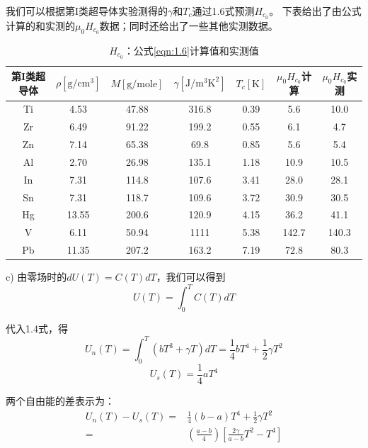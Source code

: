 我们可以根据第I类超导体实验测得的$\gamma$和$T_c$通过1.6式预测$H_{c_0}$。
下表给出了由公式计算的和实测的$\mu_0 H_{c_0}$数据；同时还给出了一些其他实测数据。
\begin{table}[htbp]\small
  \centering
  \caption{$H_{c_0}$：公式\ref{eqn:1.6}计算值和实测值} \label{tb:eqn1.6andexp}
\begin{tabular}{|c||c|c|c|c|c|c|}
  \hline
第I类超导体&$\rho [\mathrm{g/cm^3}]$&$M [\mathrm{g/mole}]$&$\gamma [\mathrm{J/m^3K^2}]$&$T_c [\mathrm{K}]$&$\mu_0 H_{c_0}$计算&$\mu_0 H_{c_0}$实测 \\ \hline \hline
Ti&4.53&47.88&316.8&0.39&5.6&10.0 \\ \hline
Zr&6.49&91.22&199.2&0.55&6.1&4.7\\ \hline
Zn&7.14&65.38&69.8&0.85&5.6&5.4\\ \hline
Al&2.70&26.98&135.1&1.18&10.9&10.5\\ \hline
In&7.31&114.8&107.6&3.41&28.0&28.1\\  \hline
Sn&7.31&118.7&109.6&3.72&30.9&30.5\\  \hline
Hg&13.55&200.6&120.9&4.15&36.2&41.1\\  \hline
V&6.11&50.94&1111&5.38&142.7&140.3\\  \hline
Pb&11.35&207.2&163.2&7.19&72.8&80.3 \\  \hline
\end{tabular}
\end{table}

c) 由零场时的$dU(T)=C(T)dT$，我们可以得到
\begin{equation*}
U(T) =\int_{0}^{T}C(T) dT  \tag{S1.12}
\end{equation*}

代入1.4式，得
\begin{equation*}
U_n(T) =\int_{0}^{T}(bT^3 +\gamma T)dT = \frac{1}{4}bT^4 +\frac{1}{2}\gamma T^2 \tag{S1.13a}
\end{equation*}
\begin{equation*}
U_s(T)=\frac{1}{4}aT^4 \tag{S1.13b}
\end{equation*}

两个自由能的差表示为：
\begin{equation*}
\begin{split}
U_n(T) − U_s(T) =&\frac{1}{4} (b − a)T^4 + \frac{1}{2}\gamma T^2\\
=&\left(\frac{a-b}{4}\right)\left[\frac{2\gamma}{a-b}T^2-T^4\right]
\end{split} \tag{S1.14}
\end{equation*}

